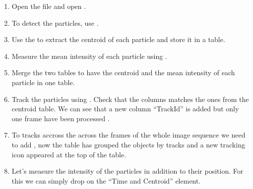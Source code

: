 \begin{enumerate}
    \item Open the file  and open .
    \item To detect the particles, use 
    . 
    \item Use the  to extract the centroid of each particle and store it in a table.
    \item Measure the mean intensity of each particle using .
    \item Merge the two tables to have the centroid and the mean intensity of each particle in one table. 
    \item Track the particles using . Check that the columns matches the ones from the centroid table. We can see that a new column ``TrackId'' is added but only one frame have been processed
    .
    \item To tracks accross the across the frames of the whole image sequence we need to add , now the table has grouped the objects by tracks and a new tracking icon appeared at the top of the table.   
    \item Let's measure the intensity of the particles in addition to their position. For this we can simply drop  on the ``Time and Centroid'' element.
\end{enumerate}


